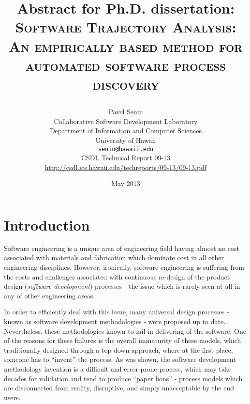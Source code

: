 \documentclass[12pt,oneside]{article}
\numberwithin{equation}{subsection}
\begin{document}
\title{Abstract for Ph.D. dissertation: \\
       \textsc{Software Trajectory Analysis:} \\
       \textsc{An empirically based method for automated software process discovery} \\
       \author{Pavel Senin \\
               Collaborative Software Development Laboratory \\
               Department of Information and Computer Sciences \\
               University of Hawaii \\[0.3cm]
               \texttt{senin@hawaii.edu} \\[0.3cm]
               CSDL Technical Report 09-13 \\
               \url{http://csdl.ics.hawaii.edu/techreports/09-13/09-13.pdf}
       }
       \date{May 2013}
}
\maketitle

\clearpage


\section{Introduction}
Software engineering is a unique area of engineering field having almost no cost associated with
materials and fabrication which dominate cost in all other engineering disciplines. 
However, ironically, software engineering is suffering from the costs and challenges
associated with continuous re-design of the product design (\textit{software development}) 
processes - the issue which is rarely seen at all in any of other engineering areas. 

In order to efficiently deal with this issue, many universal design processes - known as 
software development methodologies - were proposed up to date. 
Nevertheless, these methodologies known to fail in delivering of the software. 
One of the reasons for these failures is the overall immaturity of these models, which
traditionally designed through a top-down approach, where at the first place, someone has to
``invent'' the process. As was shown, the software development methodology invention is a difficult
and error-prone process, which may take decades for validation and tend to produce ``paper lions'' -
process models which are disconnected from reality, disruptive, and simply unacceptable by the end
users.
\end{document}

